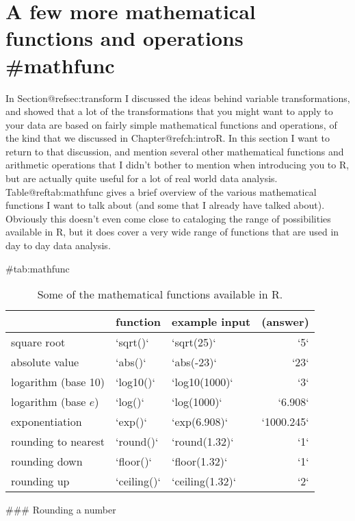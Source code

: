 \section{A few more mathematical functions and operations {#mathfunc}}

In Section@refsec:transform I discussed the ideas behind variable transformations, and showed that a lot of the transformations that you might want to apply to your data are based on fairly simple mathematical functions and operations, of the kind that we discussed in Chapter@refch:introR. In this section I want to return to that discussion, and mention several other mathematical functions and arithmetic operations that I didn't bother to mention when introducing you to R, but are actually quite useful for a lot of real world data analysis. Table@reftab:mathfunc gives a brief overview of the various mathematical functions I want to talk about (and some that I already have talked about). Obviously this doesn't even come close to cataloging the range of possibilities available in R, but it does cover a very wide range of functions that are used in day to day data analysis.



\begin{table}
\begin{center}
\caption{Some of the mathematical functions available in R.} \tabcapsep
{#tab:mathfunc}
\begin{tabular}{l|llr}
 		& function 	& example input 	& (answer)\\ \hline
square root 	&`sqrt()`	& `sqrt(25)`	& `5` \\
absolute value & `abs()` & `abs(-23)` & `23` \\
logarithm (base 10)	&`log10()`	& `log10(1000)`	& `3` \\
logarithm (base $e$) &`log()`	& `log(1000)` & `6.908` \\
exponentiation	& `exp()`	& `exp(6.908)` 	& `1000.245`\\ 
rounding to nearest & `round()` & `round(1.32)` & `1` \\
rounding down & `floor()` & `floor(1.32)` & `1` \\
rounding up & `ceiling()` & `ceiling(1.32)` & `2` \\ 
\end{tabular}\tabcapsep \HR
\end{center}
\end{table} 


### Rounding a number

